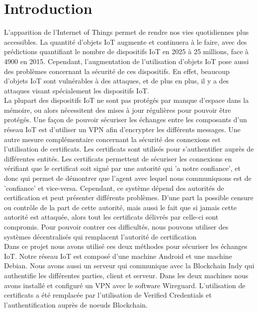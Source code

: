 \documentclass[12pt, openany]{report}
\begin{document}
\section{Introduction}
\noindent 
\begin{flushleft}
L'apparition de l'Internet of Things permet de rendre nos vies quotidiennes plus accessibles. La quantité d'objets IoT augmente et continuera à le faire, avec des prédictions quantifiant le nombre de dispositifs IoT en 2025 à 25 millions, face à 4900 en 2015. Cependant, l'augmentation de l'utilisation d'objets IoT pose aussi des problèmes concernant la sécurité de ces dispositifs. En effet, beaucoup d'objets IoT sont vulnérables à des attaques, et de plus en plus, il y a des attaques visant spécialement les dispositifs IoT.\\ 
\vspace{5mm}
La plupart des dispositifs IoT ne sont pas protégés par manque d'espace dans la mémoire, ou alors nécessitent des mises à jour régulières pour pouvoir être protégés. Une façon de pouvoir sécuriser les échanges entre les composants d'un réseau IoT est d'utiliser un VPN afin d'encrypter les différents messages. Une autre mesure complémentaire concernant la sécurité des connexions est l'utilisation de certificats. Les certificats sont utilisés pour s'authentifier auprès de différentes entités. Les certificats permettent de sécuriser les connexions en vérifiant que le certificat soit signé par une autorité qui 'a notre confiance', et donc qui permet de démontrer que l'agent avec lequel nous communiquons est de 'confiance' et vice-versa. Cependant, ce système dépend des autorités de certification et peut présenter différents problèmes. D'une part la possible censure ou contrôle de la part de cette autorité, mais aussi le fait que si jamais cette autorité est attaquée, alors tout les certificats délivrés par celle-ci sont compromis. Pour pouvoir contrer ces difficultés, nous pouvons utiliser des systèmes décentralisés qui remplacent l'autorité de certification\\
\vspace{5mm}
Dans ce projet nous avons utilisé ces deux méthodes pour sécuriser les échanges IoT. Notre réseau IoT est composé d'une machine Android et une machine Debian. Nous avons aussi un serveur qui communique avec la Blockchain Indy qui authentifie les différentes parties, client et serveur. Dans les deux machines nous avons installé et configuré un VPN avec le software Wireguard. L'utilisation de certificats a été remplacée par l'utilisation de Verified Credentials et l'authentification auprès de noeuds Blockchain. \\

\end{flushleft}
\end{document}
